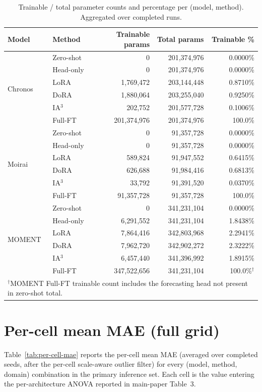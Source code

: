 \begin{table}[ht]
\centering
\caption{Trainable / total parameter counts and percentage per (model, method). Aggregated over completed runs.}
\label{tab:params}
\small
\begin{tabular}{llrrr}
\toprule
Model & Method & Trainable params & Total params & Trainable \% \\
\midrule
\multirow{6}{*}{Chronos}
 & Zero-shot & 0 & 201,374,976 & 0.0000\% \\
 & Head-only & 0 & 201,374,976 & 0.0000\% \\
 & LoRA      & 1,769,472 & 203,144,448 & 0.8710\% \\
 & DoRA      & 1,880,064 & 203,255,040 & 0.9250\% \\
 & IA$^3$    & 202,752 & 201,577,728 & 0.1006\% \\
 & Full-FT   & 201,374,976 & 201,374,976 & 100.0\% \\
\midrule
\multirow{6}{*}{Moirai}
 & Zero-shot & 0 & 91,357,728 & 0.0000\% \\
 & Head-only & 0 & 91,357,728 & 0.0000\% \\
 & LoRA      & 589,824 & 91,947,552 & 0.6415\% \\
 & DoRA      & 626,688 & 91,984,416 & 0.6813\% \\
 & IA$^3$    & 33,792 & 91,391,520 & 0.0370\% \\
 & Full-FT   & 91,357,728 & 91,357,728 & 100.0\% \\
\midrule
\multirow{6}{*}{MOMENT}
 & Zero-shot & 0 & 341,231,104 & 0.0000\% \\
 & Head-only & 6,291,552 & 341,231,104 & 1.8438\% \\
 & LoRA      & 7,864,416 & 342,803,968 & 2.2941\% \\
 & DoRA      & 7,962,720 & 342,902,272 & 2.3222\% \\
 & IA$^3$    & 6,457,440 & 341,396,992 & 1.8915\% \\
 & Full-FT   & 347,522,656 & 341,231,104 & 100.0\%$^\dagger$ \\
\bottomrule
\multicolumn{5}{l}{\scriptsize $^\dagger$MOMENT Full-FT trainable count includes the forecasting head not present in zero-shot total.} \\
\end{tabular}
\end{table}

\section{Per-cell mean MAE (full grid)}
\label{sec:per-cell-mae}
Table~\ref{tab:per-cell-mae} reports the per-cell mean MAE (averaged over completed seeds, after the per-cell scale-aware outlier filter) for every (model, method, domain) combination in the primary inference set. Each cell is the value entering the per-architecture ANOVA reported in main-paper Table~3.

